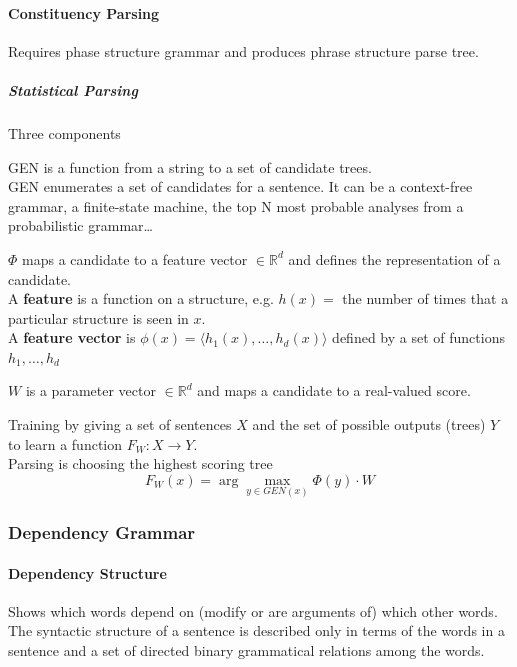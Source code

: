 \documentclass[10pt]{report}
\begin{document}
\paragraph{Constituency Parsing} Requires phase structure grammar and produces phrase structure parse tree.
\subparagraph{Statistical Parsing} Three components \begin{list}{}{}
	\item GEN is a function from a string to a set of candidate trees.\\
	GEN enumerates a set of candidates for a sentence. It can be a context-free grammar, a finite-state machine, the top N most probable analyses from a probabilistic grammar\ldots
	\item $\Phi$ maps a candidate to a feature vector $\in\mathbb{R}^d$ and defines the representation of a candidate.\\
	A \textbf{feature} is a function on a structure, e.g. $h(x) =$ the number of times that a particular structure is seen in $x$.\\
	A \textbf{feature vector} is $\phi(x)=\langle h_1(x),\ldots,h_d(x)\rangle$ defined by a set of functions $h_1,\ldots,h_d$
	\item $W$ is a parameter vector $\in\mathbb{R}^d$ and maps a candidate to a real-valued score.
\end{list}
Training by giving a set of sentences $X$ and the set of possible outputs (trees) $Y$ to learn a function $F_W:X\rightarrow Y$.\\
Parsing is choosing the highest scoring tree $$F_W(x)=\arg\max_{y\in GEN(x)}\Phi(y)\cdot W$$
\subsubsection{Dependency Grammar}
\paragraph{Dependency Structure} Shows which words depend on (modify or are arguments of) which other words. The syntactic structure of a sentence is described only in terms of the words in a sentence and a set of directed binary grammatical relations among the words.
\end{document}
